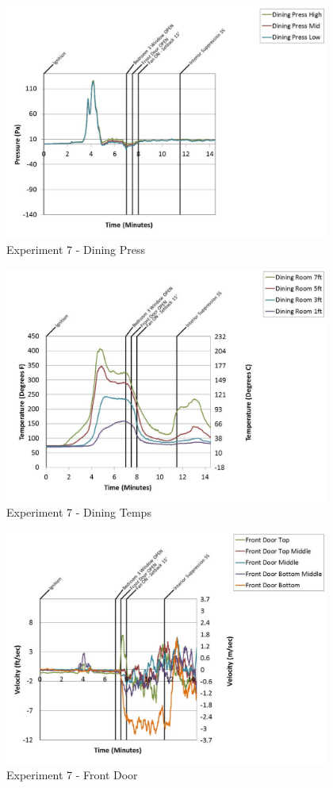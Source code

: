 \documentclass{article}
\begin{document}
\begin{appendices}
	\begin{figure}[h!]
		\centering
		\includegraphics[height=3.05in]{0_Images/Results_Charts/Exp_7_Charts/DiningPress.pdf}
		\caption{Experiment 7 - Dining Press}
	\end{figure}
 
	\clearpage

	\begin{figure}[h!]
		\centering
		\includegraphics[height=3.05in]{0_Images/Results_Charts/Exp_7_Charts/DiningTemps.pdf}
		\caption{Experiment 7 - Dining Temps}
	\end{figure}
 

	\begin{figure}[h!]
		\centering
		\includegraphics[height=3.05in]{0_Images/Results_Charts/Exp_7_Charts/FrontDoor.pdf}
		\caption{Experiment 7 - Front Door}
	\end{figure}
 

\end{appendices}
\end{document}
